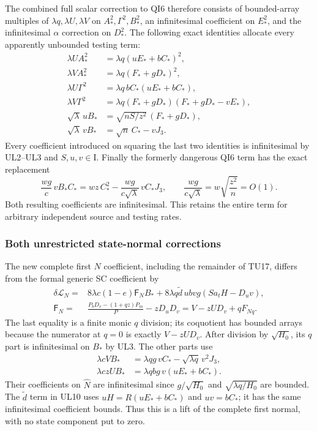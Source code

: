 The combined full scalar correction to QI6 therefore consists of
bounded-array multiples of $\lambda q,\lambda U,\lambda V$
on $A_*^2,\Gamma^2,B_*^2$, an infinitesimal coefficient on
$E_*^2$, and the infinitesimal $\alpha$ correction on $D_*^2$.
The following exact identities allocate every apparently unbounded
testing term:
\[
\begin{aligned}
\lambda U A_*^2&=\lambda q(uE_*+bC_*)^2,\\
\lambda V A_*^2&=\lambda q(F_*+gD_*)^2,\\
\lambda U\Gamma^2&=\lambda q\,bC_*(uE_*+bC_*),\\
\lambda V\Gamma^2&=\lambda q(F_*+gD_*)
                                    (F_*+gD_*-vE_*),\\
\sqrt\lambda\,uB_*&=\sqrt{nS/z^2}\,(F_*+gD_*),\\
\sqrt\lambda\,vB_*&=\sqrt n\,C_*-vJ_3 .
\end{aligned}                                                   \tag{UL8}
\]
Every coefficient introduced on squaring the last two identities
is infinitesimal by UL2--UL3 and $S,u,v\in\mathrm I$.
Finally the formerly dangerous QI6 term has the exact replacement
\[
 \frac{wg}{c}\,vB_*C_*
       =wz\,C_*^2-\frac{wg}{c\sqrt\lambda}\,vC_*J_3,
 \qquad
 \frac{wg}{c\sqrt\lambda}
          =w\sqrt{\frac{z^2}{n}}=O(1).                          \tag{UL9}
\]
Both resulting coefficients are infinitesimal. This retains the
entire term for arbitrary independent source and testing rates.

\subsubsection*{Both unrestricted state-normal corrections}

The new complete first $N$ coefficient, including the remainder
of TU17, differs from the formal generic SC coefficient by
\[
\begin{split}
\delta\mathcal L_N={}&
 8\lambda c(1-e)\mathsf F_N B_*
 +8\lambda q\widetilde d\,ubvg(Sa_tH-D_uv),\\
\mathsf F_N={}&
 \frac{P_bD_v-(1+qz)P_m}{P}-zD_uD_v
                 =V-zUD_v+qF_{Nq}.
\end{split}                                                     \tag{UL10}
\]
The last equality is a finite monic $q$ division; its coquotient
has bounded arrays because the numerator at $q=0$ is exactly
$V-zUD_v$. After division by $\sqrt{H_0}$, its $q$ part is
infinitesimal on $B_*$ by UL3. The other parts use
\[
\begin{split}
\lambda cV B_*&=\lambda qg\,vC_*
                            -\sqrt{\lambda q}\,v^2J_3,\\
\lambda czU B_*&=\lambda qbg\,v(uE_*+bC_*).
\end{split}                                                     \tag{UL11}
\]
Their coefficients on $\widehat N$ are infinitesimal since
$g/\sqrt{H_0}$ and $\sqrt{\lambda q/H_0}$ are bounded.
The $\widetilde d$ term in UL10 uses
$uH=R(uE_*+bC_*)$ and $uv=bC_*$; it has the same
infinitesimal coefficient bounds. Thus this is a lift of the
complete first normal, with no state component put to zero.

